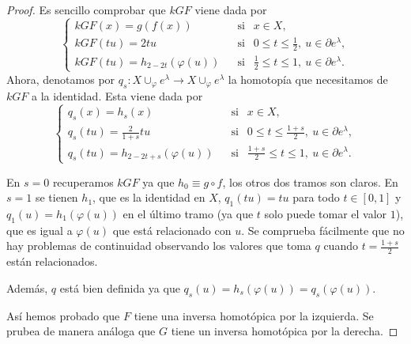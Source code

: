 \begin{proof}
    Es sencillo comprobar que $kGF$ viene dada por
    \begin{equation*}
        \begin{cases}
            kGF(x) = g(f(x)) &~~\text{ si }~~ x\in X,\\
            kGF(tu) = 2tu &~~\text{ si }~~ 0\le t\le \frac{1}{2},~u\in \partial e^{\lambda},\\
            kGF(tu) = h_{2-2t}(\varphi(u)) &~~\text{ si }~~ \frac{1}{2}\le t\le 1,~u\in \partial e^{\lambda}.
        \end{cases}
    \end{equation*} 
    Ahora, denotamos por $q_s:X\cup_{\varphi} e^{\lambda}\to X\cup_{\varphi} e^{\lambda}$ la homotopía que necesitamos de $kGF$ a la identidad. Esta viene dada por
    \begin{equation*}
        \begin{cases}
            q_s(x) = h_s(x) &~~\text{ si }~~ x\in X,\\
            q_s(tu) = \frac{2}{1+s}tu &~~\text{ si }~~ 0\le t\le \frac{1+s}{2},~u\in \partial e^{\lambda},\\
            q_s(tu) = h_{2-2t+s}(\varphi(u)) &~~\text{ si }~~ \frac{1+s}{2}\le t\le 1,~u\in \partial e^{\lambda}.
        \end{cases}
    \end{equation*}

    En $s=0$ recuperamos $kGF$ ya que $h_0\equiv g\circ f$, los otros dos tramos son claros. En $s=1$ se tienen $h_1$, que es la identidad en $X$,  $q_1(tu)=tu$ para todo $t\in[0,1]$ y $q_1(u)=h_1(\varphi(u))$ en el último tramo (ya que $t$ solo puede tomar el valor $1$), que es igual a $\varphi(u)$ que está relacionado con $u$. Se comprueba fácilmente que no hay problemas de continuidad observando los valores que toma $q$ cuando $t=\frac{1+s}{2}$ están relacionados.

    Además, $q$ está bien definida ya que $q_s(u) = h_s(\varphi(u)) = q_s(\varphi(u))$.

    Así hemos probado que $F$ tiene una inversa homotópica por la izquierda. Se prubea de manera análoga que $G$ tiene un inversa homotópica por la derecha. 
    

\end{proof}
